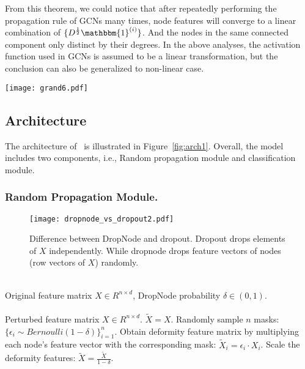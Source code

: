 {{\begin{theorem}
\end{theorem}
From this theorem, we could notice that after repeatedly performing the propagation rule of GCNs many times, node features will converge to a linear combination of $\{D^{\frac{1}{2}}\mathbbm{1}^{(i)}\}$. And the nodes in the same connected component only distinct by their degrees. In the above analyses, the activation function used in GCNs is assumed to be a linear transformation, but the conclusion can also be generalized to non-linear case\cite{oono2019graph}.
}

\begin{figure*}
    \centering
    \texttt{[image: grand6.pdf]}
    \caption{Architecture of \model.}
    \label{fig:arch1}
\end{figure*}

\subsection{Architecture}
The architecture of \model\ is illustrated in Figure~\ref{fig:arch1}. Overall, the model includes two components, i.e., Random propagation module and classification module.


\subsubsection{Random Propagation Module.}
\label{sec:randpro}
\begin{figure}
    \centering
    \texttt{[image: dropnode\_vs\_dropout2.pdf]}
    \caption{Difference between DropNode and dropout. Dropout drops  elements of $X$ independently. While dropnode drops feature vectors of nodes (row vectors of $X$) randomly.}
    \label{fig:dropnode_vs_dropout}
\end{figure}



\begin{algorithm}[tb]
\caption{Dropnode}
\label{alg:dropnode}
\begin{algorithmic}[1] 
\REQUIRE ~~\\
Original feature matrix $X \in R^{n \times d}$, DropNode probability 
$\delta \in (0,1)$. \\
\ENSURE ~~\\
Perturbed feature matrix  $X\in R^{n \times d}$.
\STATE $\widetilde{X} = X$.
\ELSE
\STATE Randomly sample $n$ masks: $\{\epsilon_i \sim Bernoulli(1-\delta)\}_{i=1}^n$.
\STATE Obtain deformity feature matrix by  multiplying each node's feature vector with the corresponding  mask: $\widetilde{X}_{i} = \epsilon_i \cdot X_{i} $.
\STATE Scale the deformity features: $\widetilde{X} = \frac{\widetilde{X}}{1-\delta}$.
\ENDIF
\end{algorithmic}
\end{algorithm}

}
